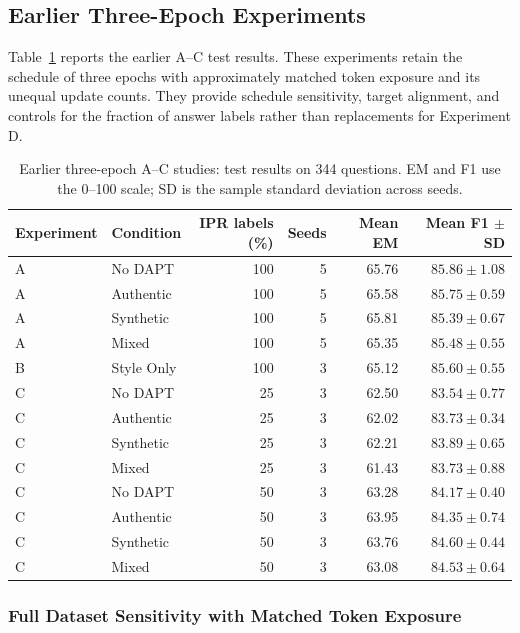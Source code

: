 \documentclass[pdflatex,sn-basic]{sn-jnl}
\begin{document}
\subsection{Earlier Three-Epoch Experiments}

Table~\ref{tab:final_test} reports the earlier A--C test results. These
experiments retain the schedule of three epochs with approximately matched token exposure and
its unequal update counts. They provide schedule sensitivity, target alignment,
and controls for the fraction of answer labels rather than replacements for Experiment D.

\begin{table}[!htbp]
\caption{Earlier three-epoch A--C studies: test results on 344 questions. EM
and F1 use the 0--100 scale; SD is the sample standard deviation across seeds.}
\label{tab:final_test}
\centering
\small
\begin{tabular}{@{}llrrrr@{}}
\toprule
Experiment & Condition & IPR labels (\%) & Seeds & Mean EM & Mean F1 $\pm$ SD \\
\midrule
A & No DAPT & 100 & 5 & 65.76 & $85.86\pm1.08$ \\
A & Authentic & 100 & 5 & 65.58 & $85.75\pm0.59$ \\
A & Synthetic & 100 & 5 & 65.81 & $85.39\pm0.67$ \\
A & Mixed & 100 & 5 & 65.35 & $85.48\pm0.55$ \\
B & Style Only & 100 & 3 & 65.12 & $85.60\pm0.55$ \\
\midrule
C & No DAPT & 25 & 3 & 62.50 & $83.54\pm0.77$ \\
C & Authentic & 25 & 3 & 62.02 & $83.73\pm0.34$ \\
C & Synthetic & 25 & 3 & 62.21 & $83.89\pm0.65$ \\
C & Mixed & 25 & 3 & 61.43 & $83.73\pm0.88$ \\
C & No DAPT & 50 & 3 & 63.28 & $84.17\pm0.40$ \\
C & Authentic & 50 & 3 & 63.95 & $84.35\pm0.74$ \\
C & Synthetic & 50 & 3 & 63.76 & $84.60\pm0.44$ \\
C & Mixed & 50 & 3 & 63.08 & $84.53\pm0.64$ \\
\bottomrule
\end{tabular}
\end{table}

\subsubsection{Full Dataset Sensitivity with Matched Token Exposure}\label{sec:full_results}
\end{document}
